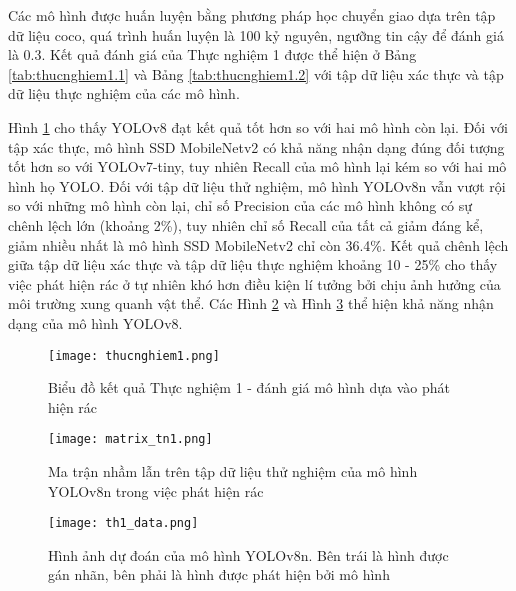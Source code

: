 \documentclass[../the.tex]{subfiles}
\begin{document}
{\fontsize{13}{12} \selectfont

Các mô hình được huấn luyện bằng phương pháp học chuyển giao dựa trên tập dữ liệu coco, quá trình huấn luyện là 100 kỷ nguyên, ngưỡng tin cậy để đánh giá là 0.3.
Kết quả đánh giá của Thực nghiệm 1 được thể hiện ở Bảng \ref{tab:thucnghiem1.1}
và Bảng \ref{tab:thucnghiem1.2} với tập dữ liệu xác thực và tập dữ liệu thực nghiệm của các mô hình.

}

\bigskip

{\fontsize{13}{12} \selectfont

    Hình \ref{fig:thucnghiem1} cho thấy YOLOv8 đạt kết quả tốt hơn so với hai mô hình còn lại. Đối với tập xác thực, mô hình SSD MobileNetv2 có khả năng nhận dạng đúng đối tượng tốt hơn so với YOLOv7-tiny, tuy nhiên Recall của mô hình lại kém so với hai mô hình họ YOLO.
    Đối với tập dữ liệu thử nghiệm, mô hình YOLOv8n vẫn vượt rội so với những mô hình còn lại, chỉ số Precision của các mô hình không có sự chênh lệch lớn (khoảng 2\%), tuy nhiên chỉ số Recall của tất cả giảm đáng kể, giảm nhiều nhất là mô hình SSD MobileNetv2 chỉ còn 36.4\%.
    Kết quả chênh lệch giữa tập dữ liệu xác thực và tập dữ liệu thực nghiệm khoảng 10 - 25\% cho thấy việc phát hiện rác ở tự nhiên khó hơn điều kiện lí tưởng bởi chịu ảnh hưởng của môi trường xung quanh vật thể.
    Các Hình \ref{fig:thucnghiem1.2} và Hình \ref{fig:thucnghiem1.3} thể hiện khả năng nhận dạng của mô hình YOLOv8.

}

\begin{figure}[H]
    \centering
    \texttt{[image: thucnghiem1.png]}
    \caption{Biểu đồ kết quả Thực nghiệm 1 - đánh giá mô hình dựa vào phát hiện rác}
    \label{fig:thucnghiem1}
\end{figure}

\begin{figure}[H]
    \centering
    \texttt{[image: matrix\_tn1.png]}
    \caption{Ma trận nhầm lẫn trên tập dữ liệu thử nghiệm của mô hình YOLOv8n trong việc phát hiện rác}
    \label{fig:thucnghiem1.2}
\end{figure}

\begin{figure}[H]
    \centering
    \texttt{[image: th1\_data.png]}
    \caption{Hình ảnh dự đoán của mô hình YOLOv8n. Bên trái là hình được gán nhãn, bên phải là hình được phát hiện bởi mô hình}
    \label{fig:thucnghiem1.3}
\end{figure}
\end{document}
